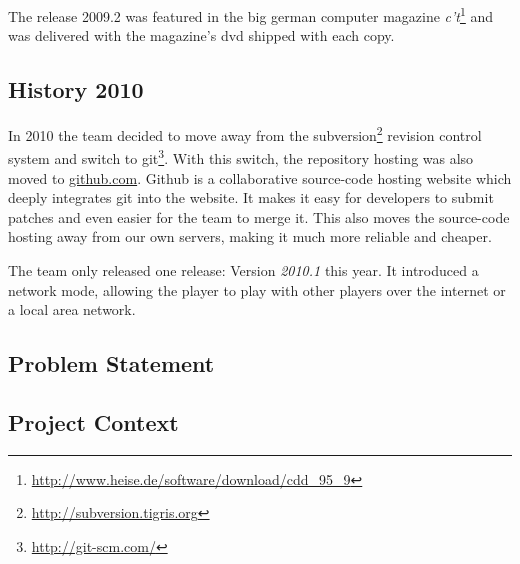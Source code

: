 The release 2009.2 was featured in the big german computer magazine \textit{c't}\footnote{\url{http://www.heise.de/software/download/cdd_95_9}} and was delivered with the magazine's
dvd shipped with each copy. 

\subsection{History 2010}
In 2010 the team decided to move away from the subversion\footnote{\url{http://subversion.tigris.org}} revision control
system and switch to git\footnote{\url{http://git-scm.com/}}. With this switch, the repository hosting was also moved to
\href{http://www.github.com}{github.com}. Github is a collaborative source-code hosting website which deeply integrates
git into the website. It makes it easy for developers to submit patches and even easier for the team to merge it. This
also moves the source-code hosting away from our own servers, making it much more reliable and cheaper.

The team only released one release: Version \textit{2010.1} this year. It introduced a network mode, allowing the player
to play with other players over the internet or a local area network.





\subsection{Problem Statement}

\subsection{Project Context}


